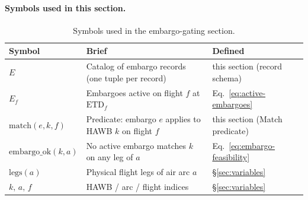 \documentclass[11pt,a4paper]{article}
\theoremstyle{definition}
\begin{document}
\paragraph{Symbols used in this section.}
\begin{table}[H]
\centering
\caption{Symbols used in the embargo-gating section.}
\label{tab:embargo-syms}
\begin{tabular}{lp{9cm}p{3.5cm}}
\toprule
Symbol & Brief & Defined \\
\midrule
$E$ & Catalog of embargo records (one tuple per record) & this section (record schema) \\
$E_f$ & Embargoes active on flight $f$ at $\text{ETD}_f$ & Eq.~\ref{eq:active-embargoes} \\
$\text{match}(e, k, f)$ & Predicate: embargo $e$ applies to HAWB $k$ on flight $f$ & this section (Match predicate) \\
$\text{embargo\_ok}(k, a)$ & No active embargo matches $k$ on any leg of $a$ & Eq.~\ref{eq:embargo-feasibility} \\
$\text{legs}(a)$ & Physical flight legs of air arc $a$ & \S\ref{sec:variables} \\
$k,\, a,\, f$ & HAWB / arc / flight indices & \S\ref{sec:variables} \\
\bottomrule
\end{tabular}
\end{table}
\end{document}
